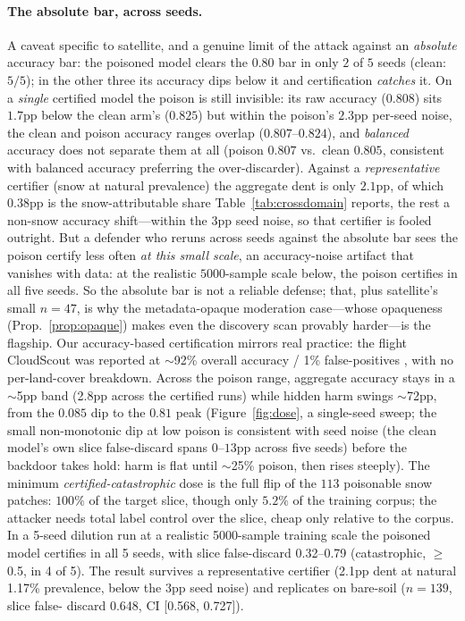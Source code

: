 \documentclass[conference]{IEEEtran}
\begin{document}
\paragraph{The absolute bar, across seeds.} A caveat specific to satellite, and a genuine limit of the attack against an \emph{absolute} accuracy bar: the
poisoned model clears the $0.80$ bar in only $2$ of $5$ seeds (clean: $5/5$); in the other three its accuracy dips
below it and certification \emph{catches} it. On a \emph{single} certified model the poison is still invisible: its
raw accuracy ($0.808$) sits $1.7$pp below the clean arm's ($0.825$) but within the poison's $2.3$pp per-seed noise,
the clean and poison accuracy ranges overlap ($0.807$--$0.824$), and \emph{balanced} accuracy does not separate
them at all (poison $0.807$ vs.\ clean $0.805$, consistent with balanced accuracy preferring the over-discarder).
Against a \emph{representative} certifier (snow at natural prevalence) the aggregate dent is only $2.1$pp, of
which $0.38$pp is the snow-attributable share Table~\ref{tab:crossdomain} reports, the rest a non-snow accuracy
shift---within the $3$pp seed noise, so that certifier is fooled outright. But a defender who reruns across seeds against the
absolute bar sees the poison certify less often \emph{at this small scale}, an accuracy-noise artifact that
vanishes with data: at the realistic $5000$-sample scale below, the poison certifies in all five seeds. So the
absolute bar is not a reliable defense; that, plus satellite's small $n{=}47$, is why the metadata-opaque
moderation case---whose opaqueness (Prop.~\ref{prop:opaque}) makes even the discovery scan provably
harder---is the flagship. Our accuracy-based certification mirrors real
practice: the flight CloudScout was reported at $\sim$92\% overall accuracy / 1\% false-positives
\cite{giuffrida2022}, with no per-land-cover breakdown. Across the poison range, aggregate
accuracy stays in a $\sim$5pp band (2.8pp across the certified runs) while hidden harm swings $\sim$72pp, from
the $0.085$ dip to the $0.81$ peak (Figure~\ref{fig:dose}, a single-seed sweep; the small
non-monotonic dip at low poison is consistent with seed noise (the clean model's own slice false-discard spans
$0$--$13$pp across five seeds) before the backdoor takes hold: harm is flat until
$\sim$25\% poison, then rises steeply). The minimum \emph{certified-catastrophic} dose is the full flip of the
$113$ poisonable snow patches: $100\%$ of the target slice, though only $5.2\%$ of the training corpus; the
attacker needs total label control over the slice, cheap only relative to the corpus. In a 5-seed dilution run at a realistic
5000-sample training scale the poisoned model certifies in all 5 seeds, with slice false-discard 0.32--0.79 (catastrophic,
$\geq$0.5, in 4 of 5). The result survives a representative certifier (2.1pp dent at
natural 1.17\% prevalence, below the 3pp seed noise) and replicates on bare-soil ($n{=}139$, slice false-
discard 0.648, CI [0.568, 0.727]).
\end{document}
